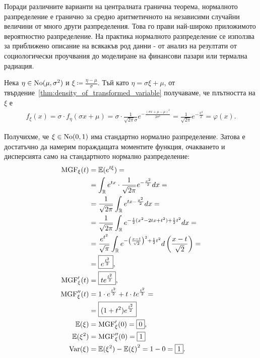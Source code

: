 \documentclass[numbers=endperiod, bibliography=totocnumbered]{scrartcl}
\begin{document}
Поради различните варианти на централната гранична теорема, нормалното разпределение е гранично за средно аритметичното на независими случайни величини от много други разпределения. Това го прави най-широко приложимото вероятностно разпределение. На практика нормалното разпределение се използва за приближено описание на всякакъв род данни - от анализ на резултати от социологически проучвания до моделиране на финансови пазари или термална радиация.

Нека \( \eta \in \operatorname{No}(\mu, \sigma^2) \) и \( \xi \coloneqq \frac {\eta - \mu} \sigma \). Тъй като \( \eta = \sigma \xi + \mu \), от твърдение~\ref{thm:density_of_transformed_variable} получаваме, че плътността на \( \xi \) е
\begin{align*}
  f_\xi(x)
  =
  \sigma \cdot f_\eta(\sigma x + \mu)
  =
  \sigma \cdot \frac 1 {\sqrt{2\pi} \sigma} e^{-\frac{{(\sigma x + \mu -\mu)}^2} {2\sigma^2}}
  =
  \frac 1 {\sqrt{2\pi}} e^{-\frac {x^2} 2}
  =
  \varphi(x).
\end{align*}

Получихме, че \( \xi \in \operatorname{No}(0, 1) \) има стандартно нормално разпределение. Затова е достатъчно да намерим пораждащата моментите функция, очакването и дисперсията само на стандартното нормално разпределение:
\begingroup
\allowdisplaybreaks
\begin{align*}
  \operatorname{MGF}_\xi(t)
  &=
  \mathbb{E}(e^{t\xi})
  = \\ &=
  \int_{\mathbb{R}} e^{tx} \cdot \frac 1 {\sqrt{2\pi}} e^{-\frac {x^2} 2} dx
  = \\ &=
  \frac 1 {\sqrt{2\pi}} \int_{\mathbb{R}} e^{tx -\frac {x^2} 2} dx
  = \\ &=
  \frac 1 {\sqrt{2\pi}} \int_{\mathbb{R}} e^{- \frac 1 2 (x^2 - 2tx + t^2) + \frac 1 2 t^2} dx
  = \\ &=
  \frac {e^{t^2}} {\sqrt \pi} \int_{\mathbb{R}} e^{- {\left(\frac {x - t} {\sqrt 2} \right)}^2 + \frac 1 2 t^2} d\left( \frac {x - t} {\sqrt 2} \right)
  = \\ &=
  \boxed{e^{\frac {t^2} 2}},
  \\
  \operatorname{MGF}'_\xi(t)
  &=
  \boxed{t e^{\frac {t^2} 2}},
  \\
  \operatorname{MGF}''_\xi(t)
  &=
  1 \cdot e^{\frac {t^2} 2} + t \cdot t e^{\frac {t^2} 2}
  = \\ &=
  \boxed{(1 + t^2) e^{\frac {t^2} 2}}
  \\
  \mathbb{E}(\xi)
  &=
  \operatorname{MGF}'_\xi(0)
  =
  \boxed{0},
  \\
  \mathbb{E}(\xi^2)
  &=
  \operatorname{MGF}''_\xi(0)
  =
  \boxed{1}
  \\
  \operatorname{Var}(\xi)
  &=
  \mathbb{E}(\xi^2) - {\mathbb{E}(\xi)}^2
  =
  1 - 0
  =
  \boxed{1}.
\end{align*}
\endgroup
\end{document}
